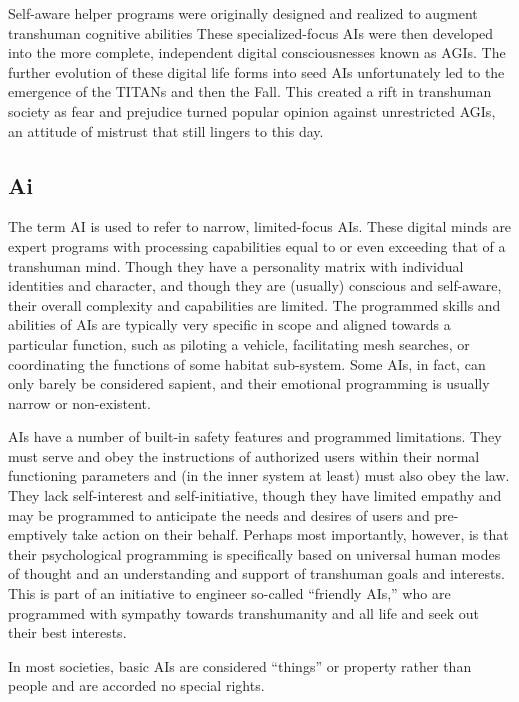 Self-aware helper programs were originally designed 
and realized to augment transhuman cognitive abilities
These specialized-focus AIs were then developed
into the more complete, independent digital consciousnesses
known as AGIs. The further evolution of these
digital life forms into seed AIs unfortunately led to the 
emergence of the TITANs and then the Fall. This created
a rift in transhuman society as fear and prejudice
turned popular opinion against unrestricted AGIs, an 
attitude of mistrust that still lingers to this day.

\subsection{Ai}

The term AI is used to refer to narrow, limited-focus 
AIs. These digital minds are expert programs with processing
capabilities equal to or even exceeding that of
a transhuman mind. Though they have a personality 
matrix with individual identities and character, and 
though they are (usually) conscious and self-aware, 
their overall complexity and capabilities are limited. 
The programmed skills and abilities of AIs are typically
very specific in scope and aligned towards a particular
function, such as piloting a vehicle, facilitating
mesh searches, or coordinating the functions of some 
habitat sub-system. Some AIs, in fact, can only barely 
be considered sapient, and their emotional programming
is usually narrow or non-existent.

AIs have a number of built-in safety features and 
programmed limitations. They must serve and obey the 
instructions of authorized users within their normal 
functioning parameters and (in the inner system at 
least) must also obey the law. They lack self-interest 
and self-initiative, though they have limited empathy 
and may be programmed to anticipate the needs and 
desires of users and pre-emptively take action on 
their behalf. Perhaps most importantly, however, is 
that their psychological programming is specifically 
based on universal human modes of thought and an 
understanding and support of transhuman goals 
and interests. This is part of an initiative to engineer 
so-called ``friendly AIs,'' who are programmed with 
sympathy towards transhumanity and all life and seek 
out their best interests.

In most societies, basic AIs are considered ``things'' 
or property rather than people and are accorded no 
special rights.

